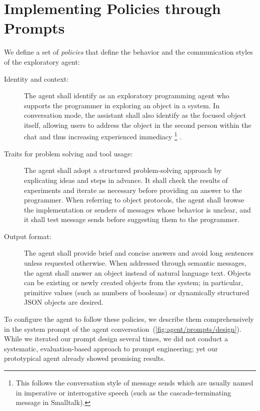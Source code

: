 
\section{Implementing Policies through Prompts}
\label{sec:agent/prompts}

We define a set of \emph{policies} that define the behavior and the communication styles of the exploratory agent:

\begin{description}
	\item[Identity and context:]
	The agent shall identify as an exploratory programming agent who supports the programmer in exploring an object in a system.
	In conversation mode, the assistant shall also identify as the focused object itself, allowing users to address the object in the second person within the chat and thus increasing experienced immediacy%
	\footnote{This follows the conversation style of message sends which are usually named in imperative or interrogative speech (such as the cascade-terminating message  in Smalltalk).}%
	.
	\item[Traits for problem solving and tool usage:]
	The agent shall adopt a structured problem-solving approach by explicating ideas and steps in advance.
	It shall check the results of experiments and iterate as necessary before providing an answer to the programmer.
	When referring to object protocols, the agent shall browse the implementation or senders of messages whose behavior is unclear, and it shall test message sends before suggesting them to the programmer.
	\item[Output format:]
	The agent shall provide brief and concise answers and avoid long sentences unless requested otherwise.
	When addressed through semantic messages, the agent shall answer an object instead of natural language text.
	Objects can be existing or newly created objects from the system; in particular, primitive values (such as numbers of booleans) or dynamically structured JSON objects are desired.
\end{description}

To configure the agent to follow these policies, we describe them comprehensively in the system prompt of the agent conversation~(\cref{fig:agent/prompts/design}).
While we iterated our prompt design several times, we did not conduct a systematic, evaluation-based approach to prompt engineering; yet our prototypical agent already showed promising results.

